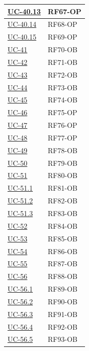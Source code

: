 ﻿\documentclass[a4paper,12pt]{article}
\begin{document}
{\begin{longtable}{|p{4cm}|p{4cm}|}
    \hline
    \hyperref[fig:uc-40.13]{UC-40.13} & RF67-OP \\
    \hline
    \hyperref[fig:uc-40.14]{UC-40.14} & RF68-OP \\
    \hline
    \hyperref[fig:uc-40.15]{UC-40.15} & RF69-OP \\
    \hline
    \hyperref[fig:uc-41]{UC-41} & RF70-OB \\
    \hline
    \hyperref[fig:uc-42]{UC-42} & RF71-OB \\
    \hline
    \hyperref[fig:uc-43]{UC-43} & RF72-OB \\
    \hline
    \hyperref[fig:uc-44]{UC-44} & RF73-OB \\
    \hline
    \hyperref[fig:uc-45]{UC-45} & RF74-OB \\
    \hline
    \hyperref[fig:uc-46]{UC-46} & RF75-OP \\
    \hline
    \hyperref[fig:uc-47]{UC-47} & RF76-OP \\
    \hline
    \hyperref[fig:uc-48]{UC-48} & RF77-OP \\
    \hline
    \hyperref[fig:uc-49]{UC-49} & RF78-OB \\
    \hline
    \hyperref[fig:uc-50]{UC-50} & RF79-OB \\
    \hline
    \hyperref[fig:uc-51]{UC-51} & RF80-OB \\
    \hline
    \hyperref[fig:uc-51.1]{UC-51.1} & RF81-OB \\
    \hline
    \hyperref[fig:uc-51.2]{UC-51.2} & RF82-OB \\
    \hline
    \hyperref[fig:uc-51.3]{UC-51.3} & RF83-OB \\
    \hline
    \hyperref[fig:uc-52]{UC-52} & RF84-OB \\
    \hline
    \hyperref[fig:uc-53]{UC-53} & RF85-OB \\
    \hline
    \hyperref[fig:uc-54]{UC-54} & RF86-OB \\
    \hline
    \hyperref[fig:uc-55]{UC-55} & RF87-OB \\
    \hline
    \hyperref[fig:uc-56]{UC-56} & RF88-OB \\
    \hline
    \hyperref[fig:uc-56.1]{UC-56.1} & RF89-OB \\
    \hline
    \hyperref[fig:uc-56.2]{UC-56.2} & RF90-OB \\
    \hline
    \hyperref[fig:uc-56.3]{UC-56.3} & RF91-OB \\
    \hline
    \hyperref[fig:uc-56.4]{UC-56.4} & RF92-OB \\
    \hline
    \hyperref[fig:uc-56.5]{UC-56.5} & RF93-OB \\
    \hline


\end{longtable}}
\end{document}
